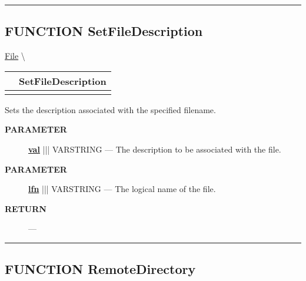 \rule{\linewidth}{0.5pt}
\subsection*{\textsf{\colorbox{headtoc}{\color{white} FUNCTION}
SetFileDescription}}

\hypertarget{ecldoc:file.setfiledescription}{}
\hspace{0pt} \hyperlink{ecldoc:File}{File} \textbackslash 

{\renewcommand{\arraystretch}{1.5}
\begin{tabularx}{\textwidth}{|>{\raggedright\arraybackslash}l|X|}
\hline
\hspace{0pt}\mytexttt{\color{red} } & \textbf{SetFileDescription} \\
\hline
\multicolumn{2}{|>{\raggedright\arraybackslash}X|}{\hspace{0pt}\mytexttt{\color{param} (varstring lfn, varstring val)}} \\
\hline
\end{tabularx}
}

\par





Sets the description associated with the specified filename.






\par
\begin{description}
\item [\colorbox{tagtype}{\color{white} \textbf{\textsf{PARAMETER}}}] \textbf{\underline{val}} ||| VARSTRING --- The description to be associated with the file.
\item [\colorbox{tagtype}{\color{white} \textbf{\textsf{PARAMETER}}}] \textbf{\underline{lfn}} ||| VARSTRING --- The logical name of the file.
\end{description}







\par
\begin{description}
\item [\colorbox{tagtype}{\color{white} \textbf{\textsf{RETURN}}}] \textbf{} --- 
\end{description}




\rule{\linewidth}{0.5pt}
\subsection*{\textsf{\colorbox{headtoc}{\color{white} FUNCTION}
RemoteDirectory}}

